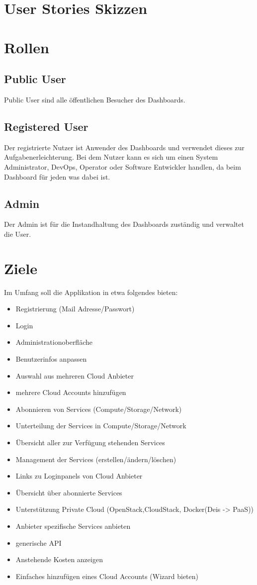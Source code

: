 \section{User Stories Skizzen}
\section{Rollen}
\subsection{Public User}
Public User sind alle öffentlichen Besucher des Dashboards.

\subsection{Registered User}
Der registrierte Nutzer ist Anwender des Dashboards und verwendet dieses zur 
Aufgabenerleichterung.
Bei dem Nutzer kann es sich um einen System Administrator, DevOps, Operator oder
Software Entwickler handlen, da beim Dashboard für jeden was dabei ist.

\subsection{Admin}
Der Admin ist für die Instandhaltung des Dashboards zuständig und verwaltet die 
User.

\section{Ziele}
Im Umfang soll die Applikation in etwa folgendes bieten:
\begin{itemize}
  \item Registrierung (Mail Adresse/Passwort)
  \item Login
  \item Administrationoberfläche
  \item Benutzerinfos anpassen
  \item Auswahl aus mehreren Cloud Anbieter
  \item mehrere Cloud Accounts hinzufügen
  \item Abonnieren von Services (Compute/Storage/Network)
  \item Unterteilung der Services in Compute/Storage/Network
  \item Übersicht aller zur Verfügung stehenden Services
  \item Management der Services (erstellen/ändern/löschen)
  \item Links zu Loginpanels von Cloud Anbieter
  \item Übersicht über abonnierte Services
  \item Unterstützung Private Cloud (OpenStack,CloudStack, Docker(Deis -> PaaS))
  \item Anbieter spezifische Services anbieten
  \item generische API
  \item Anstehende Kosten anzeigen
  \item Einfaches hinzufügen eines Cloud Accounts (Wizard bieten)
\end{itemize}


